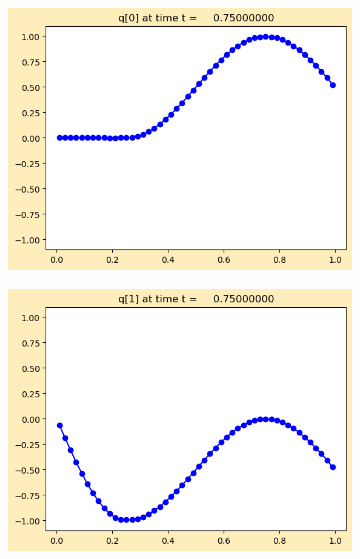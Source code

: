\documentclass{article}
\begin{document}
\begin{figure}[H]
\begin{subfigure}{0.495\linewidth}
		\includegraphics[width=\linewidth]{standing/_plots/frame0015fig0.png}
	\end{subfigure}
	\begin{subfigure}{0.495\linewidth}
		\centering
		\includegraphics[width=\linewidth]{standing/_plots/frame0015fig1.png}
	\end{subfigure}
\end{figure}
\end{document}
